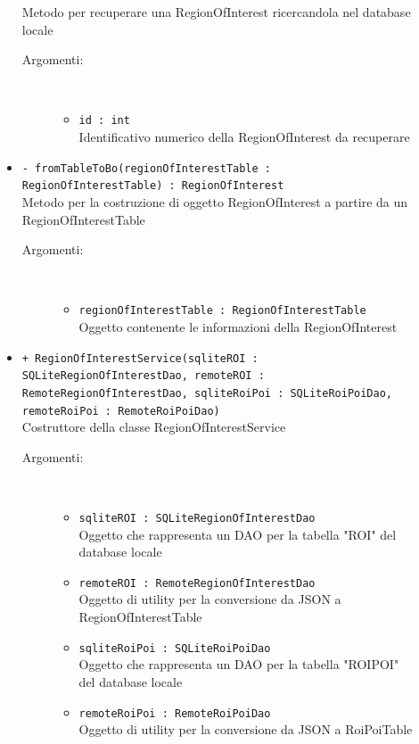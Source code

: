 \documentclass[../DefinizioneDiProdotto.tex]{subfiles}
\begin{document}
\begin{description}
\begin{itemize}
Metodo per recuperare una RegionOfInterest ricercandola nel database locale
 \begin{description}
\item[Argomenti:] \
\begin{itemize}
\item \texttt{id : int}\\
Identificativo numerico della RegionOfInterest da recuperare\end{itemize}
\end{description}
\item \texttt{- fromTableToBo(regionOfInterestTable : RegionOfInterestTable) : RegionOfInterest}\\
Metodo per la costruzione di oggetto RegionOfInterest a partire da un RegionOfInterestTable
 \begin{description}
\item[Argomenti:] \
\begin{itemize}
\item \texttt{regionOfInterestTable : RegionOfInterestTable}\\
Oggetto contenente le informazioni della RegionOfInterest\end{itemize}
\end{description}
\item \texttt{+ RegionOfInterestService(sqliteROI : SQLiteRegionOfInterestDao, remoteROI : RemoteRegionOfInterestDao, sqliteRoiPoi : SQLiteRoiPoiDao, remoteRoiPoi : RemoteRoiPoiDao)}\\
Costruttore della classe RegionOfInterestService
 \begin{description}
\item[Argomenti:] \
\begin{itemize}
\item \texttt{sqliteROI : SQLiteRegionOfInterestDao}\\
Oggetto che rappresenta un DAO per la tabella "ROI" del database locale\item \texttt{remoteROI : RemoteRegionOfInterestDao}\\
Oggetto di utility per la conversione da JSON a RegionOfInterestTable\item \texttt{sqliteRoiPoi : SQLiteRoiPoiDao}\\
Oggetto che rappresenta un DAO per la tabella "ROIPOI" del database locale\item \texttt{remoteRoiPoi : RemoteRoiPoiDao}\\
Oggetto di utility per la conversione da JSON a RoiPoiTable\end{itemize}
\end{description}
\end{itemize}
\end{description}
\end{document}
